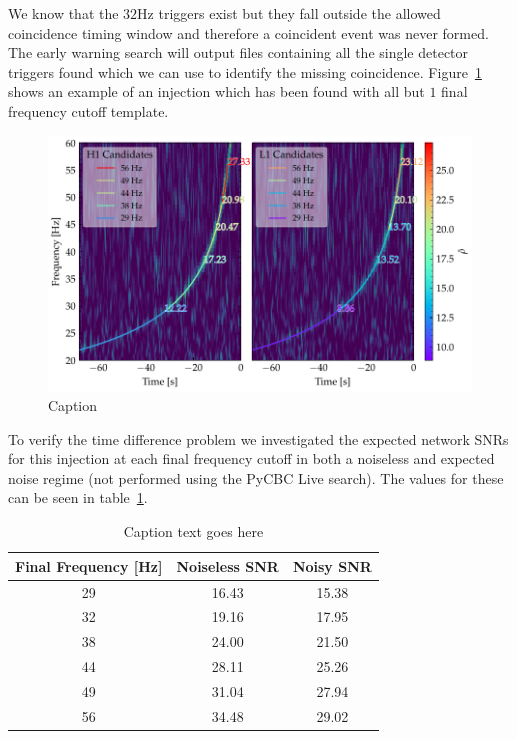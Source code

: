 We know that the $32$Hz triggers exist but they fall outside the allowed coincidence timing window and therefore a coincident event was never formed. The early warning search will output files containing all the single detector triggers found which we can use to identify the missing coincidence. Figure~\ref{6:fig:missing-freq-eg} shows an example of an injection which has been found with all but $1$ final frequency cutoff template. 
%
\begin{figure}
    \centering
    \includegraphics[width=1.0\linewidth]{images/6_earlywarning/stories/missing_freqs_example.pdf}
    \caption{Caption}
    \label{6:fig:missing-freq-eg}
\end{figure}
%
To verify the time difference problem we investigated the expected network SNRs for this injection at each final frequency cutoff in both a noiseless and expected noise regime (not performed using the PyCBC Live search). The values for these can be seen in table~\ref{6:tab:noise_snrs}.
%
\begin{table}[ht]
    \centering
    \setlength{\tabcolsep}{4pt}
    \begin{tabular}{ccc}
        \toprule
        \textbf{Final Frequency [Hz]} & \textbf{Noiseless SNR} & \textbf{Noisy SNR} \\
        \midrule
        29 & 16.43 & 15.38 \\
        32 & 19.16 & 17.95 \\
        38 & 24.00 & 21.50 \\
        44 & 28.11 & 25.26 \\
        49 & 31.04 & 27.94 \\
        56 & 34.48 & 29.02 \\
        \bottomrule
    \end{tabular}
    \caption{Caption text goes here}
    \label{6:tab:noise_snrs}
\end{table}
